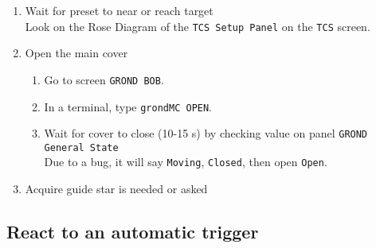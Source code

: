 \documentclass[11pt,fleqn]{book}
\begin{document}
\begin{enumerate}
\begin{enumerate}
    \item Wait for \gls{preset} to near or reach target\\
          Look on the Rose Diagram of the \texttt{TCS Setup Panel} on the \texttt{TCS} screen.
    \item Open the main cover
    \begin{enumerate}
      \item Go to screen \texttt{GROND BOB}.
      \item In a terminal, type \texttt{grondMC OPEN}.
      \item Wait for cover to close (10-15 s) by checking value on panel \texttt{GROND General State}\\
            Due to a bug, it will say \texttt{Moving}, \texttt{Closed}, then open \texttt{Open}. 
    \end{enumerate}
    \item Acquire guide star is needed or asked
  \end{enumerate}
\end{enumerate}


\subsection{React to an automatic trigger}
\end{document}
